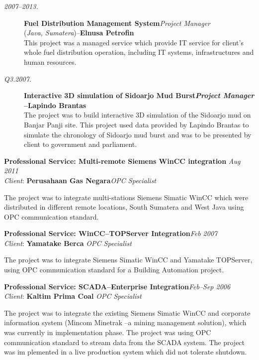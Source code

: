 \documentclass[12pt]{res} %
\begin{document}
\begin{resume}
\vspace{10pt} 
\begin{description}
    \item[{\sl 2007--2013.}] {\bf Fuel Distribution Management System}\hfill {\sl Project Manager}\\({\sl Java, Sumatera})--{\bf Elnusa Petrofin}\\
    This project was a managed service which provide IT service for client's whole fuel distribution operation, including IT systems, infrastructures
    and human resources.
    \item[{\sl Q3.2007.}] {\bf Interactive 3D simulation of Sidoarjo Mud Burst\hfill {\sl Project Manager}\\--Lapindo Brantas}\\
    The project was to build interactive 3D simulation of the Sidoarjo mud on Banjar Panji site. This project used data provided by Lapindo Brantas 
    to simulate the chronology of Sidoarjo mud burst and was to be presented by client to government and parliament.
\end{description}

{\bf Professional Service: Multi-remote Siemens WinCC integration} \hfill {\sl Aug 2011}\\
{\sl Client}: {\bf Perusahaan Gas Negara}\hfill {\sl OPC Specialist}

\vspace{-10pt} 
The project was to integrate multi-stations Siemens Simatic WinCC which were distributed
in different remote locations, South Sumatera and West Java using OPC communication standard.

{\bf Professional Service: WinCC--TOPServer Integration}\hfill {\sl Feb 2007}\\
{\sl Client}: {\bf Yamatake Berca} \hfill {\sl OPC Specialist}

\vspace{-10pt} 
The project was to integrate Siemens Simatic WinCC and Yamatake TOPServer, using OPC
communication standard for a Building Automation project.

{\bf Professional Service: SCADA--Enterprise Integration}\hfill {\sl Feb--Sep 2006}\\
{\sl Client}: {\bf Kaltim Prima Coal} \hfill {\sl OPC Specialist}

\vspace{-10pt} 
The project was to integrate the existing Siemens Simatic WinCC and corporate information system 
(Mincom Minetrak --a mining management solution), which was currently in implementation phase. The
project was using OPC communication standard to stream data from the SCADA system. The
project was im plemented in a live production system which did not tolerate shutdown.


\end{resume}
\end{document}
